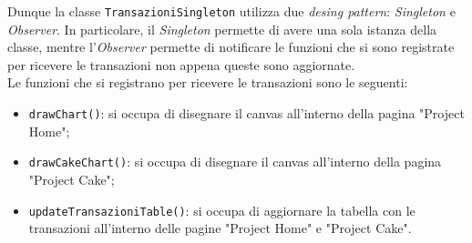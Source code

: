 Dunque la classe \texttt{TransazioniSingleton} utilizza due \textit{desing
pattern}: \textit{Singleton} e \textit{Observer}. In particolare, il
\textit{Singleton} permette di avere una sola istanza della classe, mentre
l'\textit{Observer} permette di notificare le funzioni che si sono registrate
per ricevere le transazioni non appena queste sono aggiornate.\\
Le funzioni che si registrano per ricevere le transazioni sono le seguenti:
\begin{itemize}
	\item \texttt{drawChart()}: si occupa di disegnare il canvas all'interno
		della pagina "Project Home";

	\item \texttt{drawCakeChart()}: si occupa di disegnare il canvas all'interno
		della pagina "Project Cake";

	\item \texttt{updateTransazioniTable()}: si occupa di aggiornare la tabella
		con le transazioni all'interno delle pagine "Project Home" e "Project
		Cake".
\end{itemize}










